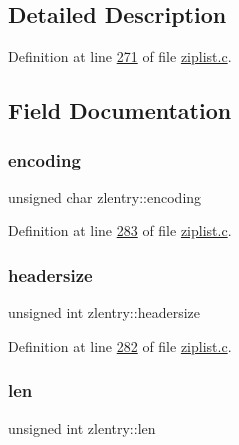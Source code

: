 \subsection{Detailed Description}


Definition at line \hyperlink{ziplist_8c_source_l00271}{271} of file \hyperlink{ziplist_8c_source}{ziplist.\+c}.



\subsection{Field Documentation}
\mbox{\label{structzlentry_ae9e4799b790e81d1b0d1406894b4bc27}} 
\subsubsection{\texorpdfstring{encoding}{encoding}}
{\footnotesize\ttfamily unsigned char zlentry\+::encoding}



Definition at line \hyperlink{ziplist_8c_source_l00283}{283} of file \hyperlink{ziplist_8c_source}{ziplist.\+c}.

\mbox{\label{structzlentry_aab92ade10c45021bc4293f37130bf066}} 
\subsubsection{\texorpdfstring{headersize}{headersize}}
{\footnotesize\ttfamily unsigned int zlentry\+::headersize}



Definition at line \hyperlink{ziplist_8c_source_l00282}{282} of file \hyperlink{ziplist_8c_source}{ziplist.\+c}.

\mbox{\label{structzlentry_a194c63ce78ae85d0516ccd7ca0296666}} 
\subsubsection{\texorpdfstring{len}{len}}
{\footnotesize\ttfamily unsigned int zlentry\+::len}



